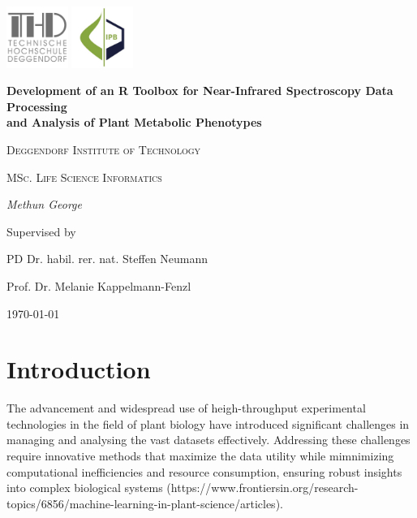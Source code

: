 \documentclass[12pt,a4paper]{report}
\begin{document}
\begin{titlepage}
    \centering
    \begin{flushright}
        \centering
        \includegraphics[width=2cm]{images/thd.png} %
        \hspace{0cm} %
        \includegraphics[width=2cm]{images/ipb.jpg} %
    \end{flushright}
    {\huge\bfseries Development of an R Toolbox for Near-Infrared Spectroscopy Data Processing \\
    and Analysis of Plant Metabolic Phenotypes\par}
    \vspace{2cm}
    {\LARGE \textsc{Deggendorf Institute of Technology}\par}
    \vspace{1cm}
    {\Large \textsc{MSc. Life Science Informatics}\par}
    \vspace{1.5cm}
    {\Large\itshape Methun George\par}
    \vfill
    Supervised by\par
    PD Dr. habil. rer. nat. Steffen Neumann\par
    Prof. Dr. Melanie Kappelmann-Fenzl
    \vfill
    {\large \today\par}
\end{titlepage}

\newpage
\tableofcontents
\newpage


\chapter{Introduction}
The advancement and widespread use of heigh-throughput experimental 
technologies in the field of plant biology have introduced significant 
challenges in managing and analysing the vast datasets effectively. Addressing
these challenges require innovative methods that maximize the data utility 
while mimnimizing computational inefficiencies and resource consumption, ensuring
robust insights into complex biological systems (https://www.frontiersin.org/research-topics/6856/machine-learning-in-plant-science/articles). 
\end{document}
